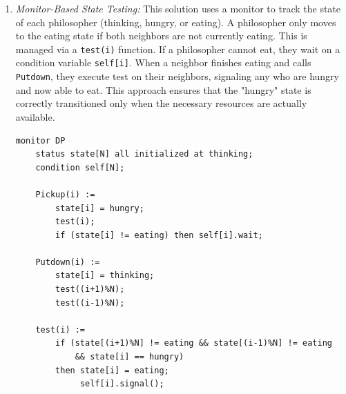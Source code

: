 \begin{enumerate}
\begin{minipage}{\textwidth}
\begin{lstlisting}[mathescape]
semaphores fork[N] all initialized at 1
semaphore table initialized at N-1
\end{lstlisting}
\begin{lstlisting}[mathescape]
Philosopher(i) :=
    Repeat
        think;
        table.down();
        fork[i].down();
        fork[(i+1)%N].down();
        eat;
        fork[(i+1)%N].up();
        fork[i].up();
        table.up() 
\end{lstlisting}
\end{minipage}\\

    \item \textit{Monitor-Based State Testing:} This solution uses a monitor to track the state of each philosopher (thinking, hungry, or eating). A philosopher only moves to the eating state if both neighbors are not currently eating. This is managed via a \texttt{test(i)} function. If a philosopher cannot eat, they wait on a condition variable \texttt{self[i]}. When a neighbor finishes eating and calls \texttt{Putdown}, they execute test on their neighbors, signaling any who are hungry and now able to eat. This approach ensures that the "hungry" state is correctly transitioned only when the necessary resources are actually available.
    
\begin{minipage}{\textwidth}
\begin{lstlisting}[mathescape]
monitor DP
    status state[N] all initialized at thinking;
    condition self[N];

    Pickup(i) :=
        state[i] = hungry;
        test(i);
        if (state[i] != eating) then self[i].wait;
    
    Putdown(i) :=
        state[i] = thinking;
        test((i+1)%N);
        test((i-1)%N);
    
    test(i) :=
        if (state[(i+1)%N] != eating && state[(i-1)%N] != eating
            && state[i] == hungry)
        then state[i] = eating;
             self[i].signal();
\end{lstlisting}
\end{minipage}\\
    
\end{enumerate}


